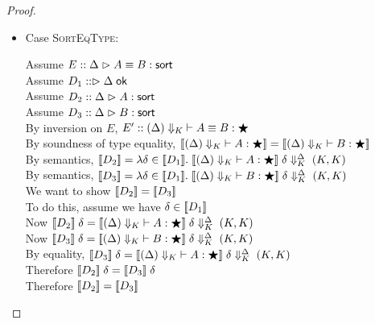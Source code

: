 \begin{proof}
\begin{itemize}
\item Case \textsc{SortEqType}:
  \begin{tabbedproof}
  \oo Assume $E :: \judgeSortEq{A}{B}$ \\
  \oo Assume $D_1 :: \judgeACtx{\Delta}$ \\
  \oo Assume $D_2 :: \judgeSort{A}$ \\
  \oo Assume $D_3 :: \judgeSort{B}$ \\
  \ooo By inversion on $E$, $E' :: \judgeKeq[\restrictkind{\Delta}]{A}{B}{\bigstar}$ \\
  \ooo By soundness of type equality, 
         $\interp{\judgeWK[\restrictkind{\Delta}]{A}{\bigstar}} = 
          \interp{\judgeWK[\restrictkind{\Delta}]{B}{\bigstar}}$ \\
  \ooo By semantics, 
          $\interp{D_2} = 
             \semfun{\delta \in \interp{D_1}}
                    {\interp{\judgeWK[\restrictkind{\Delta}]{A}{\bigstar}}
                     \;\restricttyenv{\Delta}{\delta}\;(K,K)}$ \\
  \ooo By semantics, 
          $\interp{D_3} = 
             \semfun{\delta \in \interp{D_1}}
                    {\interp{\judgeWK[\restrictkind{\Delta}]{B}{\bigstar}}
                     \;\restricttyenv{\Delta}{\delta}\;(K,K)}$ \\
  \ooo We want to show $\interp{D_2} = \interp{D_3}$ \\
  \ooo To do this, assume we have $\delta \in \interp{D_1}$ \\
  \oooo Now $\interp{D_2}\;\delta = 
                 \interp{\judgeWK[\restrictkind{\Delta}]{A}{\bigstar}}
                 \;\restricttyenv{\Delta}{\delta}\;(K,K)$ \\
  \oooo Now $\interp{D_3}\;\delta = 
                 \interp{\judgeWK[\restrictkind{\Delta}]{B}{\bigstar}}
                 \;\restricttyenv{\Delta}{\delta}\;(K,K)$ \\
  \oooo By equality, $\interp{D_3}\;\delta = 
                 \interp{\judgeWK[\restrictkind{\Delta}]{A}{\bigstar}}
                 \;\restricttyenv{\Delta}{\delta}\;(K,K)$ \\
  \oooo Therefore $\interp{D_2}\;\delta = \interp{D_3}\;\delta$ \\
  \ooo Therefore $\interp{D_2} = \interp{D_3}$ \\
  \end{tabbedproof}

\end{itemize}
\end{proof}

